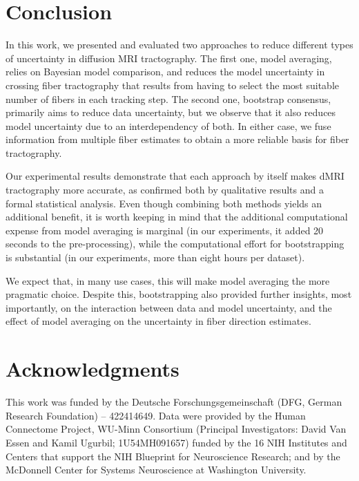 \section{Conclusion}
\label{sec:conclusion}
In this work, we presented and evaluated two approaches to reduce different types of uncertainty in diffusion MRI tractography. The first one, model averaging, relies on Bayesian model comparison, and reduces the model uncertainty in crossing fiber tractography that results from having to select the most suitable number of fibers in each tracking step. The second one, bootstrap consensus, primarily aims to reduce data uncertainty, but we observe that it also reduces model uncertainty due to an interdependency of both. In either case, we fuse information from multiple fiber estimates to obtain a more reliable basis for fiber tractography.

Our experimental results demonstrate that each approach by itself makes dMRI tractography more accurate, as confirmed both by qualitative results and a formal statistical analysis. Even though combining both methods yields an additional benefit, it is worth keeping in mind that the additional computational expense from model averaging is marginal (in our experiments, it added 20 seconds to the pre-processing), while the computational effort for bootstrapping is substantial (in our experiments, more than eight hours per dataset).

We expect that, in many use cases, this will make model averaging the more pragmatic choice. Despite this, bootstrapping also provided further insights, most importantly, on the interaction between data and model uncertainty, and the effect of model averaging on the uncertainty in fiber direction estimates.

\section*{Acknowledgments}

This work was funded by the Deutsche Forschungsgemeinschaft (DFG, German Research Foundation) -- 422414649.
Data were provided by the Human Connectome Project, WU-Minn Consortium (Principal Investigators: David Van Essen and Kamil Ugurbil; 1U54MH091657) funded by the 16 NIH Institutes and Centers that support the NIH Blueprint
for Neuroscience Research; and by the McDonnell Center for Systems Neuroscience at Washington University.

